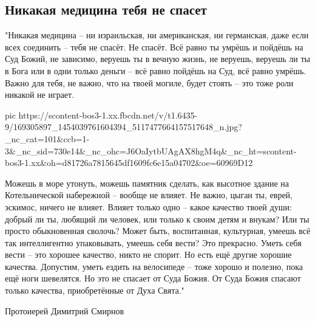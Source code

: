  
 
 
 
 

\subsection{Никакая медицина тебя не спасет}

"Никакая медицина – ни израильская, ни американская, ни германская, даже
если всех соединить – тебя не спасёт. Не спасёт. Всё равно ты умрёшь и
пойдёшь на Суд Божий, не зависимо, веруешь ты в вечную жизнь, не веруешь,
веруешь ли ты в Бога или в одни только деньги – всё равно пойдёшь на Суд,
всё равно умрёшь. Важно для тебя, не важно, что на твоей могиле, будет
стоять – это тоже роли никакой не играет. 

\ifcmt
  pic https://scontent-bos3-1.xx.fbcdn.net/v/t1.6435-9/169305897_1454039761604394_5117477664157517648_n.jpg?_nc_cat=101&ccb=1-3&_nc_sid=730e14&_nc_ohc=J6OaIytbUAgAX8hgM4q&_nc_ht=scontent-bos3-1.xx&oh=d81726a7815645df1609fc6e15a04702&oe=60969D12
\fi

Можешь в море утонуть, можешь памятник сделать, как высотное здание на
Котельнической набережной – вообще не влияет. Не важно, цыган ты, еврей,
эскимос, ничего не влияет. Влияет только одно – какое качество твоей души:
добрый ли ты, любящий ли человек, или только к своим детям и внукам? Или ты
просто обыкновенная сволочь? Может быть, воспитанная, культурная, умеешь всё
так интеллигентно упаковывать, умеешь себя вести? Это прекрасно. Уметь себя
вести – это хорошее качество, никто не спорит. Но есть ещё другие хорошие
качества. Допустим, уметь ездить на велосипеде – тоже хорошо и полезно, пока
ещё ноги шевелятся. Но это не спасает от Суда Божия. От Суда Божия спасают
только качества, приобретённые от Духа Свята."

Протоиерей Димитрий Смирнов
